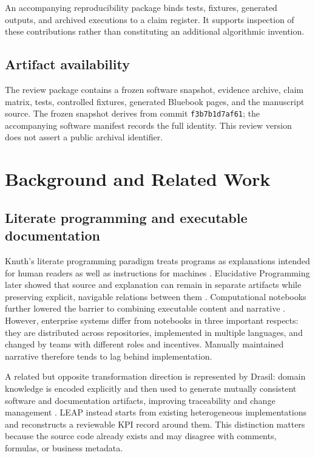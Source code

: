 \documentclass[a4paper,fleqn]{cas-dc}
\begin{document}
An accompanying reproducibility package binds tests, fixtures, generated outputs, and archived executions to a claim register. It supports inspection of these contributions rather than constituting an additional algorithmic invention.

\subsection{Artifact availability}

The review package contains a frozen software snapshot, evidence archive, claim matrix, tests, controlled fixtures, generated Bluebook pages, and the manuscript source. The frozen snapshot derives from commit \texttt{f3b7b1d7af61}; the accompanying software manifest records the full identity. This review version does not assert a public archival identifier.

\section{Background and Related Work}

\subsection{Literate programming and executable documentation}

Knuth's literate programming paradigm treats programs as explanations intended for human readers as well as instructions for machines \citep{Knuth1984}. Elucidative Programming later showed that source and explanation can remain in separate artifacts while preserving explicit, navigable relations between them \citep{Normark2000}. Computational notebooks further lowered the barrier to combining executable content and narrative \citep{Rule2018,Kluyver2016}. However, enterprise systems differ from notebooks in three important respects: they are distributed across repositories, implemented in multiple languages, and changed by teams with different roles and incentives. Manually maintained narrative therefore tends to lag behind implementation.

A related but opposite transformation direction is represented by Drasil: domain knowledge is encoded explicitly and then used to generate mutually consistent software and documentation artifacts, improving traceability and change management \citep{Carette2023}. LEAP instead starts from existing heterogeneous implementations and reconstructs a reviewable KPI record around them. This distinction matters because the source code already exists and may disagree with comments, formulas, or business metadata.
\end{document}
